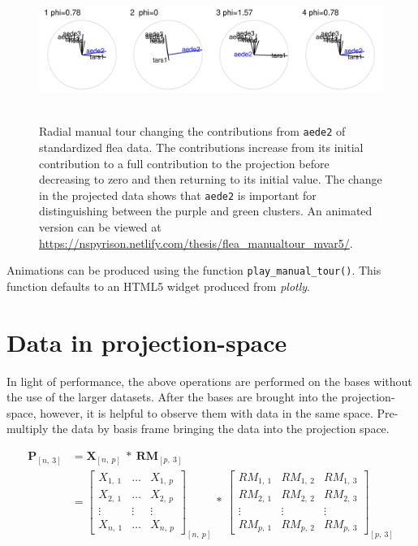 \documentclass{monashthesis}
\begin{document}
\begin{figure}

{\centering \includegraphics[width=6in,height=1.8in]{./figures/step3} 

}

\caption{Radial manual tour changing the contributions from \texttt{aede2} of standardized flea data. The contributions increase from its initial contribution to a full contribution to the projection before decreasing to zero and then returning to its initial value. The change in the projected data shows that \texttt{aede2} is important for distinguishing between the purple and green clusters. An animated version can be viewed at \url{https://nspyrison.netlify.com/thesis/flea_manualtour_mvar5/}.}\label{fig:step3}
\end{figure}

Animations can be produced using the function \texttt{play\_manual\_tour()}. This function defaults to an HTML5 widget produced from \emph{plotly}.

\hypertarget{sec:display}{%
\section{Data in projection-space}\label{sec:display}}

In light of performance, the above operations are performed on the bases without the use of the larger datasets. After the bases are brought into the projection-space, however, it is helpful to observe them with data in the same space. Pre-multiply the data by basis frame bringing the data into the projection space.

\begin{align}
  \textbf{P}_{[n,~3]}
    &= \textbf{X}_{[n,~p]} ~*~ \textbf{RM}_{[p,~3]} \\
    &=
      \begin{bmatrix}
          X_{1,~1} & \dots & X_{1,~p} \\
          X_{2,~1} & \dots & X_{2,~p} \\
          \vdots   & \vdots & \vdots  \\
          X_{n,~1} & \dots & X_{n,~p}
      \end{bmatrix}_{[n,~p]}
      ~*~
      \begin{bmatrix}
        RM_{1,~1} & RM_{1,~2} & RM_{1,~3} \\
        RM_{2,~1} & RM_{2,~2} & RM_{2,~3} \\
        \vdots     & \vdots     & \vdots  \\
        RM_{p,~1} & RM_{p,~2} & RM_{p,~3}
      \end{bmatrix}_{[p,~3]}
\end{align}
\end{document}
